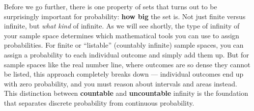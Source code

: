 Before we go further, there is one property of sets that turns out to be surprisingly important for probability: \textbf{how big} the set is. Not just finite versus infinite, but \textit{what kind} of infinite. As we will see shortly, the type of infinity of your sample space determines which mathematical tools you can use to assign probabilities. For finite or ``listable'' (countably infinite) sample spaces, you can assign a probability to each individual outcome and simply add them up. But for sample spaces like the real number line, where outcomes are so dense they cannot be listed, this approach completely breaks down --- individual outcomes end up with zero probability, and you must reason about intervals and areas instead. This distinction between \textbf{countable} and \textbf{uncountable} infinity is the foundation that separates discrete probability from continuous probability.

\newcommand{\circled}[1]{\tikz[baseline=(char.base)]{
            \node[shape=circle,draw,inner sep=1pt] (char) {#1};}}

